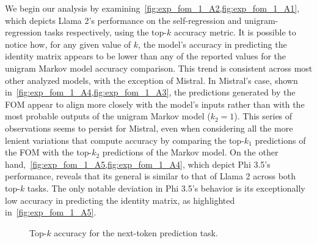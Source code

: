 We begin our analysis by examining~\cref{fig:exp_fom_1_A2,fig:exp_fom_1_A1}, which depicts Llama 2's performance on the self-regression and unigram-regression tasks respectively, using the top-$k$ accuracy metric.
It is possible to notice how, for any given value of $k$, the model's accuracy in predicting the identity matrix appears to be lower than any of the reported values for the unigram Markov model accuracy comparison.
This trend is consistent across most other analyzed models, with the exception of Mistral.
In Mistral's case, shown in~\cref{fig:exp_fom_1_A4,fig:exp_fom_1_A3}, the predictions generated by the FOM appear to align more closely with the model's inputs rather than with the most probable outputs of the unigram Markov model ($k_2 = 1$).
This series of observations seems to persist for Mistral, even when considering all the more lenient variations that compute accuracy by comparing the top-$k_1$ predictions of the FOM with the top-$k_2$ predictions of the Markov model.
On the other hand,~\cref{fig:exp_fom_1_A5,fig:exp_fom_1_A4}, which depict Phi 3.5's performance, reveals that its general is similar to that of Llama 2 across both top-$k$ tasks.
The only notable deviation in Phi 3.5's behavior is its exceptionally low accuracy in predicting the identity matrix, as highlighted in~\cref{fig:exp_fom_1_A5}.

\begin{figure}[tp!]
    \centering
    \begingroup
    \captionsetup{width=0.9\textwidth/2}
    \quad
    \quad
    \endgroup
    \caption{Top-$k$ accuracy for the next-token prediction task.}
    \label{fig:exp_fom_1_A}
\end{figure}

